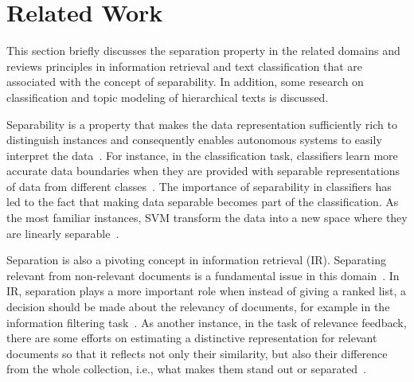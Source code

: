 \section{Related Work}
This section briefly discusses the separation property in the related domains and reviews principles in information retrieval and text classification that are associated with the concept of separability.  
In addition, some research on classification and topic modeling of hierarchical texts is discussed. 

Separability is a property that makes the data representation sufficiently rich to distinguish instances and consequently enables autonomous systems to easily interpret the data~\citep{Lewis:1992}. For instance, in the classification task, classifiers learn more accurate data boundaries when they are provided with separable representations of data from different classes~\citep{Lewis:1995}. The importance of separability in classifiers has led to the fact that making data separable becomes part of the classification. As the most familiar instances, SVM transform the data into a new space where they are linearly separable~\citep{Burges:1998}.

Separation is also a pivoting concept in information retrieval (IR). Separating relevant from non-relevant documents is a fundamental issue in this domain~\citep{Robertson:1977,saracevic:1975,Lavrenko:2001}. In IR, separation plays a more important role when instead of giving a ranked list, a decision should be made about the relevancy of documents, for example in the information filtering task~\citep{Lewis:1992}. As another instance, in the task of relevance feedback, there are some efforts on estimating a distinctive representation for relevant documents so that it reflects not only  their similarity, but also their difference from the whole collection, i.e., what makes them stand out or separated~\citep{Sparck:2003,Hiemstra:2004,Zhai:SMM:2001}. 

